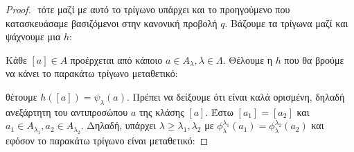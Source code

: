 \begin{proof}
    $ $\newline
    τότε μαζί με αυτό το τρίγωνο υπάρχει και το προηγούμενο που κατασκευάσαμε βασιζόμενοι στην κανονική προβολή $q$. Βάζουμε τα τρίγωνα μαζί και ψάχνουμε μια $h$:
    
    \begin{figure}[H]
        \centering
    \end{figure}

    \noindent Κάθε $[a] \in A$ προέρχεται από κάποιο $a \in A_{\lambda},\lambda \in \Lambda$. Θέλουμε η $h$ που θα βρούμε να κάνει το παρακάτω τρίγωνο μεταθετικό:

    \begin{figure}[H]
        \centering
    \end{figure}
    
    
    \noindent θέτουμε $h([a]) = \psi_{\lambda}(a)$. Πρέπει να δείξουμε ότι είναι καλά ορισμένη, δηλαδή ανεξάρτητη του αντιπροσώπου $a$ της κλάσης $[a]$.
    Έστω $[a_1] = [a_2]$ και $a_1 \in A_{\lambda_1}, a_2 \in A_{\lambda_2}$. Δηλαδή, υπάρχει $\lambda\geq \lambda_1,\lambda_2$ με $\phi^{\lambda_1}_{\lambda} (a_1) = \phi^{\lambda_2}_{\lambda}(a_2)$ και εφόσον το παρακάτω τρίγωνο είναι μεταθετικό:



\end{proof}
